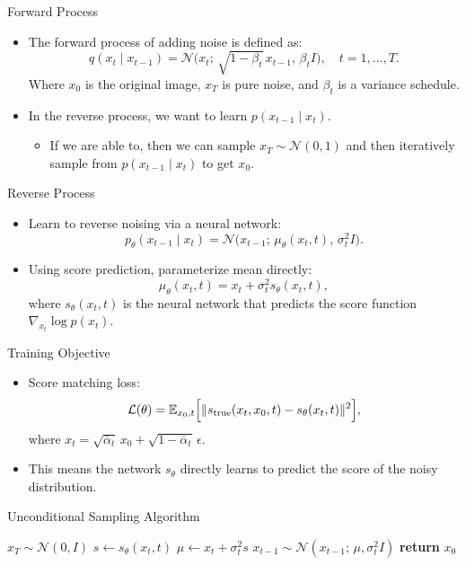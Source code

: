 \documentclass[11pt]{beamer}
\begin{document}
\begin{frame}{Forward Process}
  \begin{itemize}
    \item The forward process of adding noise is defined as:
      \[
        q(x_t \mid x_{t-1})
        = \mathcal{N}\bigl(x_t;\,\sqrt{1-\beta_t}\,x_{t-1},\,\beta_t I\bigr),
        \quad t=1,\dots,T.
      \]
      Where $x_0$ is the original image, $x_T$ is pure noise, and $\beta_t$ is a variance schedule.
    \item In the reverse process, we want to learn $p(x_{t-1}\mid x_t)$.
    \begin{itemize}
      \item If we are able to, then we can sample $x_T \sim \mathcal{N}(0, 1)$ and then iteratively sample from $p(x_{t-1}\mid x_t)$ to get $x_0$.
    \end{itemize}
  \end{itemize}
\end{frame}

\begin{frame}{Reverse Process}
  \begin{itemize}
    \item Learn to reverse noising via a neural network:
      \[
        p_\theta(x_{t-1}\mid x_t)
        = \mathcal{N}\bigl(x_{t-1};\,\mu_\theta(x_t,t),\,\sigma_t^2 I\bigr).
      \]
    \item Using score prediction, parameterize mean directly:
      \[
        \mu_\theta(x_t,t)
        = x_t + \sigma_t^2 s_\theta(x_t,t),
      \]
      where $s_\theta(x_t,t)$ is the neural network that predicts the score function $\nabla_{x_t}\log p(x_t)$.
  \end{itemize}
\end{frame}

\begin{frame}{Training Objective}
  \begin{itemize}
    \item Score matching loss:
      \[
        \mathcal{L}(\theta)
        = \mathbb{E}_{x_0,t}
          \Bigl[\|s_\text{true}(x_t, x_0, t) - s_\theta(x_t,t)\|^2\Bigr],
      \]
      where $x_t = \sqrt{\bar\alpha_t}\,x_0 + \sqrt{1-\bar\alpha_t}\,\epsilon$.
    \item This means the network $s_\theta$ directly learns to predict the score of the noisy distribution.
  \end{itemize}
\end{frame}

\begin{frame}[fragile]{Unconditional Sampling Algorithm}
  \begin{algorithmic}[1]
    \STATE $x_T \sim \mathcal{N}(0,I)$
      \STATE $s \gets s_\theta(x_t,t)$ 
      \STATE $\mu \gets x_t + \sigma_t^2 s$
      \STATE $x_{t-1}\sim \mathcal{N}(x_{t-1};\,\mu,\sigma_t^2 I)$
    \ENDFOR
    \STATE \textbf{return} $x_0$
  \end{algorithmic}
\end{frame}
\end{document}
